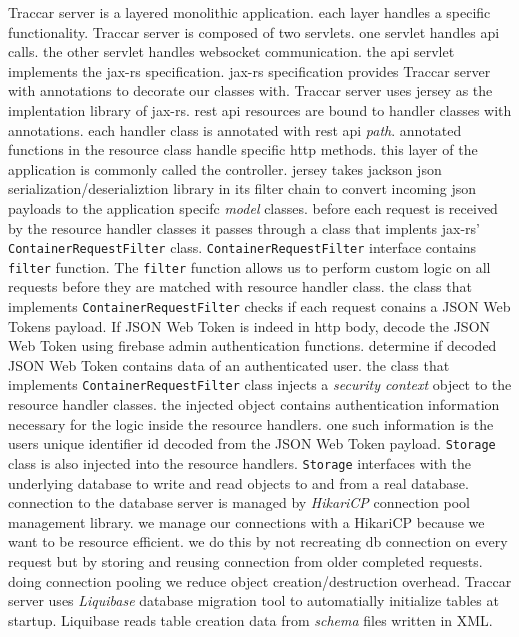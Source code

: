 \documentclass[a4paper]{article}
\begin{document}
Traccar server is a layered monolithic application. each layer handles a specific functionality.
Traccar server is composed of two servlets. one servlet handles api calls. the other servlet handles
websocket communication. the api servlet implements the jax-rs specification. jax-rs specification provides Traccar server with
annotations to decorate our classes with. Traccar server uses jersey as the implentation library of jax-rs. 
rest api resources are bound to handler classes with annotations. each handler class is annotated with rest api 
\emph{path}. annotated functions in the resource class handle specific http methods. 
this layer of the application is commonly called the controller. jersey takes jackson json 
serialization/deserializtion library in its filter chain to convert incoming json payloads to the application specifc 
\emph{model} classes. before each request is received by the resource handler classes it passes through a class that implents 
jax-rs' \lstinline{ContainerRequestFilter} class. \lstinline{ContainerRequestFilter} interface contains \lstinline{filter}
function. The \lstinline{filter} function allows us to perform custom logic on all requests before they are matched with
resource handler class. the class that implements \lstinline{ContainerRequestFilter} checks if each request conains a JSON Web 
Tokens payload. If JSON Web Token is indeed in http body, decode the JSON Web Token using firebase admin authentication 
functions. determine if decoded JSON Web Token contains data of an authenticated user. the class that implements 
\lstinline{ContainerRequestFilter} class injects a \emph{security context} object to the resource handler classes. 
the injected object contains authentication information necessary for the logic inside the resource handlers. 
one such information is the users unique identifier id decoded from the JSON Web Token payload. \lstinline{Storage}  class is 
also injected into the resource handlers. \lstinline{Storage} interfaces with the underlying database to write and
read objects to and from a real database. connection to the database server is managed by \emph{HikariCP} connection pool 
management library. we manage our connections with a HikariCP because we want to be resource efficient. we do this by not 
recreating db connection on every request but by storing and reusing connection from older completed requests. doing 
connection pooling we reduce object creation/destruction overhead. Traccar server uses \emph{Liquibase} database migration 
tool to automatially initialize tables at startup. Liquibase reads table creation data from \emph{schema} files written in XML.
\end{document}
